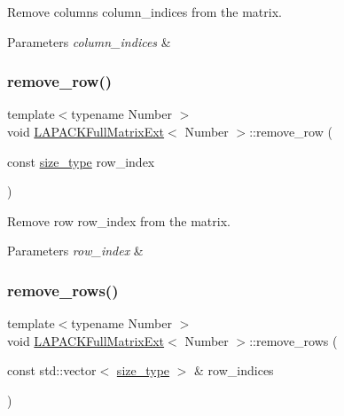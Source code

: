 Remove columns {\ttfamily column\+\_\+indices} from the matrix. 
\begin{DoxyParams}{Parameters}
{\em column\+\_\+indices} & \\
\hline
\end{DoxyParams}
\mbox{\label{classLAPACKFullMatrixExt_a28fcbdee16b201644ef5c1a7beccfeb6}} 
\subsubsection{\texorpdfstring{remove\+\_\+row()}{remove\_row()}}
{\footnotesize\ttfamily template$<$typename Number $>$ \\
void \hyperlink{classLAPACKFullMatrixExt}{L\+A\+P\+A\+C\+K\+Full\+Matrix\+Ext}$<$ Number $>$\+::remove\+\_\+row (\begin{DoxyParamCaption}\item[{const \hyperlink{classLAPACKFullMatrixExt_a5cf5f4a6104dc17029210b5ca52bf574}{size\+\_\+type}}]{row\+\_\+index }\end{DoxyParamCaption})}

Remove row {\ttfamily row\+\_\+index} from the matrix. 
\begin{DoxyParams}{Parameters}
{\em row\+\_\+index} & \\
\hline
\end{DoxyParams}
\mbox{\label{classLAPACKFullMatrixExt_a98d770a58dd87d57a3763f55e0b45502}} 
\subsubsection{\texorpdfstring{remove\+\_\+rows()}{remove\_rows()}}
{\footnotesize\ttfamily template$<$typename Number $>$ \\
void \hyperlink{classLAPACKFullMatrixExt}{L\+A\+P\+A\+C\+K\+Full\+Matrix\+Ext}$<$ Number $>$\+::remove\+\_\+rows (\begin{DoxyParamCaption}\item[{const std\+::vector$<$ \hyperlink{classLAPACKFullMatrixExt_a5cf5f4a6104dc17029210b5ca52bf574}{size\+\_\+type} $>$ \&}]{row\+\_\+indices }\end{DoxyParamCaption})}

